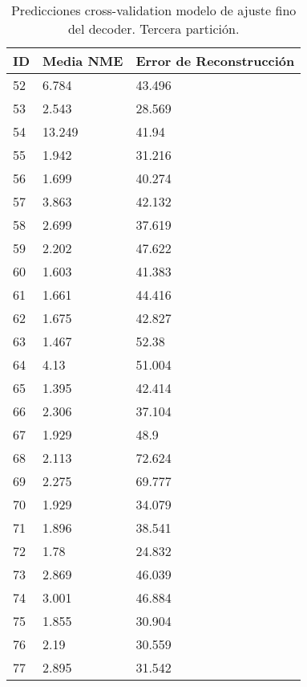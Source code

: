 \begin{table}[!ht]
    \centering
    \caption{Predicciones cross-validation modelo de ajuste fino del  decoder. Tercera partición.}
    \begin{tabular}{|l|l|l|}
    \hline
    \cellcolor{gray!25}\textbf{ID} & \cellcolor{gray!25}\textbf{Media NME} & \cellcolor{gray!25}\textbf{Error de Reconstrucción} \\ \hline
        52 & 6.784 & 43.496 \\ \hline
        53 & 2.543 & 28.569 \\ \hline
        54 & 13.249 & 41.94 \\ \hline
        55 & 1.942 & 31.216 \\ \hline
        56 & 1.699 & 40.274 \\ \hline
        57 & 3.863 & 42.132 \\ \hline
        58 & 2.699 & 37.619 \\ \hline
        59 & 2.202 & 47.622 \\ \hline
        60 & 1.603 & 41.383 \\ \hline
        61 & 1.661 & 44.416 \\ \hline
        62 & 1.675 & 42.827 \\ \hline
        63 & 1.467 & 52.38 \\ \hline
        64 & 4.13 & 51.004 \\ \hline
        65 & 1.395 & 42.414 \\ \hline
        66 & 2.306 & 37.104 \\ \hline
        67 & 1.929 & 48.9 \\ \hline
        68 & 2.113 & 72.624 \\ \hline
        69 & 2.275 & 69.777 \\ \hline
        70 & 1.929 & 34.079 \\ \hline
        71 & 1.896 & 38.541 \\ \hline
        72 & 1.78 & 24.832 \\ \hline
        73 & 2.869 & 46.039 \\ \hline
        74 & 3.001 & 46.884 \\ \hline
        75 & 1.855 & 30.904 \\ \hline
        76 & 2.19 & 30.559 \\ \hline
        77 & 2.895 & 31.542 \\ \hline
    \end{tabular}
\end{table}

